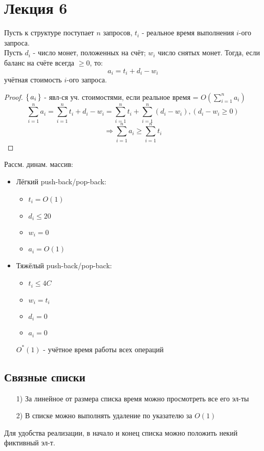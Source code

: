 \section{Лекция 6}
\begin{statement}
  Пусть к структуре поступает $n$ запросов, $t_i$ - реальное время выполнения $i$-ого запроса. \\
  Пусть $d_i$ - число монет, положенных на счёт; $w_i$ число снятых монет. Тогда, если баланс на счёте всегда $\geq 0$, то:
  \[
  a_i = t_i + d_i - w_i
  \]
  учётная стоимость $i$-ого запроса.
\end{statement}
\begin{proof}
$\set{a_i}$ - явл-ся уч. стоимостями, если реальное время = $O(\sum_{i = 1}^{n}a_i)$
\[
\sum_{i = 1}^{n} a_i = \sum_{i = 1}^{n} t_i + d_i - w_i = \sum_{i = 1}^{n} t_i+ \sum_{i = 1}^{n} (d_i - w_i), (d_i - w_i \geq 0)
\]
\[
\Rightarrow \sum_{i = 1}^{n} a_i \geq \sum_{i = 1}^{n} t_i
\]
\end{proof}
Рассм. динам. массив:
\begin{itemize}
  \item  Лёгкий push-back/pop-back:
    \begin{itemize}
      \item $t_i = O(1)$
      \item $d_i \leq 20$
      \item $w_i = 0$
      \item $a_i = O(1)$
    \end{itemize}
  \item Тяжёлый push-back/pop-back:
    \begin{itemize}
      \item $t_i \leq 4C$
      \item $w_i = t_i$
      \item $d_i = 0$
      \item $a_i = 0$
    \end{itemize}
  $O^{*}(1)$ - учётное время работы всех операций
\end{itemize}
\subsection{Связные списки}
\begin{itemize}
  \item [1) ] За линейное от размера списка время можно просмотреть все его эл-ты
  \item [2) ] В списке можно выполнять удаление по указателю за $O(1)$
\end{itemize}
\begin{note}
Для удобства реализации, в начало и конец списка можно положить некий фиктивный эл-т.
\end{note}
